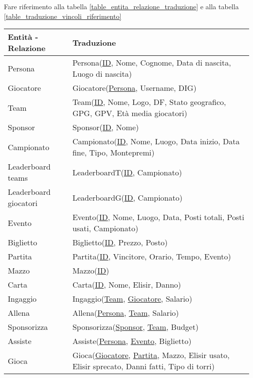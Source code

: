 \documentclass{article}
\begin{document}
Fare riferimento alla tabella \ref{table_entita_relazione_traduzione} e alla tabella \ref{table_traduzione_vincoli_riferimento}

\begin{table}
    \centering
    \begin{tabularx}{\textwidth}{|l|X|}
        \hline
        \textbf{Entità - Relazione} & \textbf{Traduzione} \\ \hline
        Persona & Persona(\underline{ID}, Nome, Cognome, Data di nascita, Luogo di nascita) \\ \hline
        Giocatore & Giocatore(\underline{Persona}, Username, DIG) \\ \hline
        Team & Team(\underline{ID}, Nome, Logo, DF, Stato geografico, GPG, GPV, Età media giocatori) \\ \hline
        Sponsor & Sponsor(\underline{ID}, Nome) \\ \hline
        Campionato & Campionato(\underline{ID}, Nome, Luogo, Data inizio, Data fine, Tipo, Montepremi) \\ \hline
        Leaderboard teams & LeaderboardT(\underline{ID}, Campionato)  \\ \hline
        Leaderboard giocatori & LeaderboardG(\underline{ID}, Campionato) \\ \hline
        Evento & Evento(\underline{ID}, Nome, Luogo, Data, Posti totali, Posti usati, Campionato) \\ \hline
        Biglietto & Biglietto(\underline{ID}, Prezzo, Posto) \\ \hline
        Partita & Partita(\underline{ID}, Vincitore, Orario, Tempo, Evento) \\ \hline
        Mazzo & Mazzo(\underline{ID}) \\ \hline %
        Carta & Carta(\underline{ID}, Nome, Elisir, Danno) \\ \hline
        Ingaggio & Ingaggio(\underline{Team}, \underline{Giocatore}, Salario) \\ \hline
        Allena & Allena(\underline{Persona}, \underline{Team}, Salario) \\ \hline
        Sponsorizza & Sponsorizza(\underline{Sponsor}, \underline{Team}, Budget) \\ \hline
        Assiste & Assiste(\underline{Persona}, \underline{Evento}, Biglietto) \\ \hline
        Gioca & Gioca(\underline{Giocatore}, \underline{Partita}, Mazzo, Elisir usato, Elisir sprecato, Danni fatti, Tipo di torri) \\ \hline

\end{tabularx}
\end{table}
\end{document}
